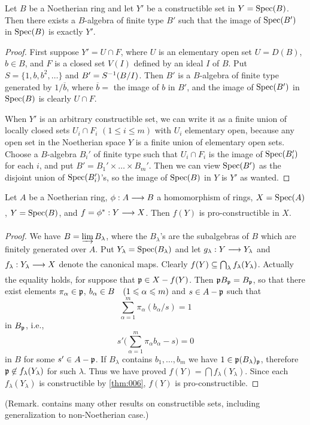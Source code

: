 \documentclass[../main]{subfiles}
\begin{document}
\begin{lemma}\label{lem:06.03}
Let $B$ be a Noetherian ring and let $Y'$ be a constructible set in $Y= \operatorname{Spec}(B)$. Then there exists a $B$-algebra of finite type $B'$ such that the image of $\operatorname{Spec}(B')$ in $\operatorname{Spec}(B)$ is exactly $Y'$.
\end{lemma} 

\begin{proof}
First suppose $Y' = U \cap F$, where $U$ is an elementary open set $U = D(B)$, $b \in B$, and $F$ is a closed set $V(I)$ defined by an ideal $I$ of $B$. Put $S = \{1,b,b^2, \dots\}$ and $B'=S^{-1} (B/I)$. Then $B'$ is a $B$-algebra of finite type generated by $1/\overline{b}$, where $\overline{b} = $ the image of $b$ in $B'$, and the image of $\operatorname{Spec}(B')$ in $\operatorname{Spec}(B)$ is clearly $U \cap F$.

When $Y'$ is an arbitrary constructible set, we can write it as a finite union of locally closed sets $U_i \cap F_i$ $(1 \le i \le m)$ with $U_i$ elementary open, because any open set in the Noetherian space $Y$ is a finite union of elementary open sets. Choose a $B$-algebra $B_i '$ of finite type such that $U_i \cap F_i$ is the image of $\operatorname{Spec}(B_i ')$ for each $i$, and put $B' = B_1 ' \times \dots \times B_m '$. Then we can view $\operatorname{Spec}(B')$ as the disjoint union of $\operatorname{Spec}(B_i ')$'s, so the image of $\operatorname{Spec}(B)$ in $Y$ is $Y'$ as wanted.
\end{proof}

\begin{parproposition}
 \label{pro:6.02} Let $A$ be a Noetherian ring, $\phi : A \varrightarrow{} B$ a homomorphism of rings, $X = \operatorname{Spec}(A)$, $Y=\operatorname{Spec}(B)$, and $f= \SpecInduced{\phi}: Y \varrightarrow{} X$. Then $f(Y)$ is pro-constructible in $X$.
\end{parproposition}

\begin{proof}
We have $B = \varinjlim B_\lambda$, where the $B_\lambda$'s are the subalgebras of $B$ which are finitely generated over $A$. Put $Y_\lambda = \operatorname{Spec}(B_\lambda)$ and let $g_\lambda : Y \varrightarrow{} Y_\lambda$ and $f_\lambda : Y_\lambda \varrightarrow{} X$ denote the canonical maps. Clearly $f(Y) \subseteq \bigcap_\lambda f_\lambda (Y_\lambda)$. Actually the equality holds, for suppose that $\mathfrak{p} \in X - f(Y)$. Then $\mathfrak{p} B_{\mathfrak{p}} = B_{\mathfrak{p}}$, so that there exist elements $\pi_\alpha \in \mathfrak{p}$, $b_\alpha \in B\for{1\leqslant \alpha \leqslant m}$ and $s \in A - \mathfrak{p}$ such that 
\[
\sum_{\alpha = 1} ^m \pi_\alpha (b_\alpha / s) = 1
\]
in $B_{\mathfrak{p}}$, i.e.,
\[
s'\bigg(\sum_{\alpha = 1} ^m \pi_\alpha b_\alpha - s\bigg) = 0
\]
in $B$ for some $s' \in A - \mathfrak{p}$. If $B_\lambda$ contains $b_1, \ldots, b_m$ we have $1 \in \mathfrak{p} (B_\lambda)_{\mathfrak{p}}$, therefore $\mathfrak{p} \not\in f_\lambda (Y_\lambda)$ for such $\lambda$. Thus we have proved $f(Y) = \bigcap f_\lambda (Y_\lambda)$. Since each $f_\lambda (Y_\lambda)$ is constructible by \ref{thm:006}, $f(Y)$ is pro-constructible.
\end{proof}
(Remark. \cite{egaIV3} contains many other results on constructible sets, including generalization to non-Noetherian case.) %
\end{document}
